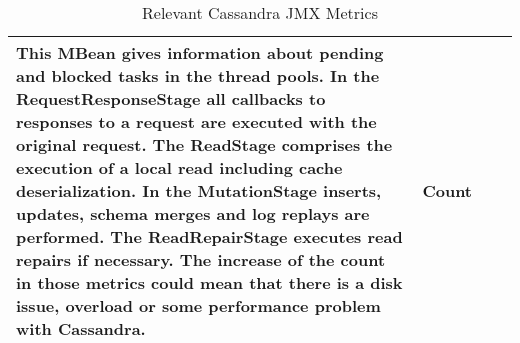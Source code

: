 \begin{table}[]
\begin{tabular}{@{}p{3.2cm}p{2.7cm}p{6.7cm}p{2.2cm}@{}}
                                                             This MBean gives information about pending and blocked tasks in the thread pools.
                                                             In the RequestResponseStage all callbacks to responses to a request are executed with the original request.
                                                             The ReadStage comprises the execution of a local read including cache deserialization.
                                                             In the MutationStage inserts, updates, schema merges and log replays are performed.
                                                             The ReadRepairStage executes read repairs if necessary.
                                                             The increase of the count in those metrics could mean that there is a disk issue, overload or some performance problem with Cassandra.
                                                             & Count \\
\bottomrule
\end{tabular}
\centering
\caption{Relevant Cassandra JMX Metrics}
\label{tab:jmx_cassandra}
\end{table}


